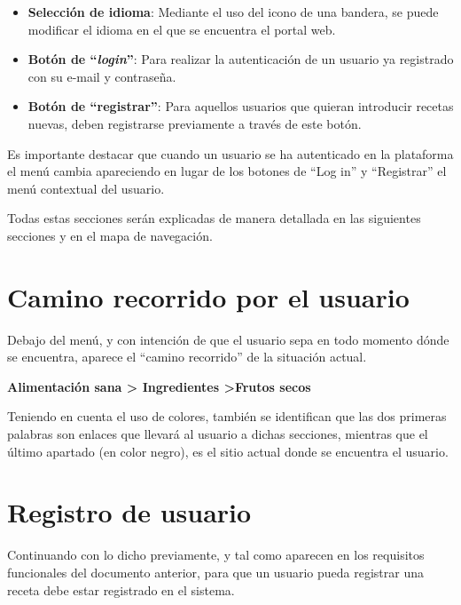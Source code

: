 \documentclass{\ClassPath/viu-tfm-template}
\begin{document}
\begin{itemize}
    \item \textbf{Selección de idioma}: Mediante el uso del icono de una bandera, se puede modificar el idioma en el que se encuentra el portal web.

    \item \textbf{Botón de “\textit{login}”}: Para realizar la autenticación de un usuario ya registrado con su e-mail y contraseña.

    \item \textbf{Botón de “registrar”}: Para aquellos usuarios que quieran introducir recetas nuevas, deben registrarse previamente a través de este botón.
    \vspace{-1em}
\end{itemize}

Es importante destacar que cuando un usuario se ha autenticado en la plataforma el menú cambia apareciendo en lugar de los botones de “Log in” y “Registrar” el menú contextual del usuario.

Todas estas secciones serán explicadas de manera detallada en las siguientes secciones y en el mapa de navegación.

\section{Camino recorrido por el usuario}

Debajo del menú, y con intención de que el usuario sepa en todo momento dónde se encuentra, aparece el “camino recorrido” de la situación actual.

\begin{center}
    \vspace{-10pt}
    \textbf{\color{maincolor}Alimentación sana > \space Ingredientes \color{black} >\space Frutos secos}
    \vspace{-15pt}
\end{center}

Teniendo en cuenta el uso de colores, también se identifican que las dos primeras palabras son enlaces que llevará al usuario a dichas secciones, mientras que el último apartado (en color negro), es el sitio actual donde se encuentra el usuario.


\section{Registro de usuario}
Continuando con lo dicho previamente, y tal como aparecen en los requisitos funcionales del documento anterior, para que un usuario pueda registrar una receta debe estar registrado en el sistema.
\end{document}
